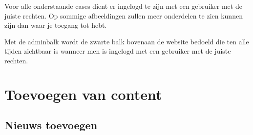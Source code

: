 Voor alle onderstaande cases dient er ingelogd te zijn met een gebruiker met de juiste rechten. Op sommige afbeeldingen zullen meer onderdelen te zien kunnen zijn dan waar je toegang tot hebt. 

Met de adminbalk wordt de zwarte balk bovenaan de website bedoeld die ten alle tijden zichtbaar is wanneer men is ingelogd met een gebruiker met de juiste rechten.

\section{Toevoegen van content}

\subsection{Nieuws toevoegen}

